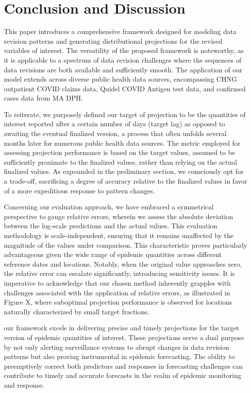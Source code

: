 

\section{Conclusion and Discussion}
This paper introduces a comprehensive framework designed for modeling data revision patterns and generating distributional projections for the revised variables of interest. The versatility of the proposed framework is noteworthy, as it is applicable to a spectrum of data revision challenges where the sequences of data revisions are both available and sufficiently smooth. The application of our model extends across diverse public health data sources, encompassing CHNG outpatient COVID claims data, Quidel COVID Antigen test data, and confirmed cases data from MA DPH. 

To reiterate, we purposely defined our target of projection to be the quantities of interest reported after a certain number of days (target lag) as opposed to awaiting the eventual finalized version, a process that often unfolds several months later for numerous public health data sources. The metric employed for assessing projection performance is based on the target values, assumed to be sufficiently proximate to the finalized values, rather than relying on the actual finalized values. As expounded in the preliminary section, we consciously opt for a trade-off, sacrificing a degree of accuracy relative to the finalized values in favor of a more expeditious response to pattern changes.

Concerning our evaluation approach, we have embraced a symmetrical perspective to gauge relative errors, wherein we assess the absolute deviation between the log-scale predictions and the actual values. This evaluation methodology is scale-independent, ensuring that it remains unaffected by the magnitude of the values under comparison. This characteristic proves particularly advantageous given the wide range of epidemic quantities across different reference dates and locations. Notably, when the original value approaches zero, the relative error can escalate significantly, introducing sensitivity issues. It is imperative to acknowledge that our chosen method inherently grapples with challenges associated with the application of relative errors, as illustrated in Figure X, where suboptimal projection performance is observed for locations naturally characterized by small target fractions.

our framework excels in delivering precise and timely projections for the target version of epidemic quantities of interest. These projections serve a dual purpose by not only alerting surveillance systems to abrupt changes in data revision patterns but also proving instrumental in epidemic forecasting. The ability to preemptively correct both predictors and responses in forecasting challenges can contribute to timely and accurate forecasts in the realm of epidemic monitoring and response.



